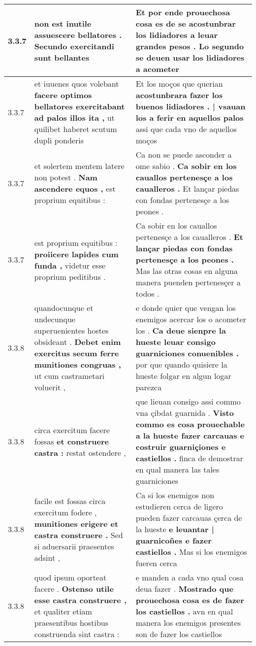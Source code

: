 \begin{tabular}{|p{1cm}|p{6.5cm}|p{6.5cm}|}
3.3.7 & non est inutile \textbf{ assuescere bellatores . } Secundo exercitandi sunt bellantes & Et por ende prouechosa cosa es de se acostunbrar los lidiadores a leuar grandes pesos . \textbf{ Lo segundo se deuen usar los lidiadores } a acometer \\\hline
3.3.7 & et iuuenes quos volebant \textbf{ facere optimos bellatores exercitabant ad palos illos ita , } ut quilibet haberet scutum dupli ponderis & Et los moços que querian \textbf{ acostunbrara fazer los buenos lidiadores . | vsauan los a ferir en aquellos palos } assi que cada vno de aquellos moços \\\hline
3.3.7 & et solertem mentem latere non potest . \textbf{ Nam ascendere equos , } est proprium equitibus : & Ca non se puede asconder a ome sabio . \textbf{ Ca sobir en los cauallos pertenesçe a los caualleros . } Et lançar piedas con fondas pertenesçe a los peones . \\\hline
3.3.7 & est proprium equitibus : \textbf{ proiicere lapides cum funda , } videtur esse proprium peditibus . & Ca sobir en los cauallos pertenesçe a los caualleros . \textbf{ Et lançar piedas con fondas pertenesçe a los peones . } Mas las otras cosas en alguna manera puenden pertenesçer a todos . \\\hline
3.3.8 & quandocunque et undecunque superuenientes hostes obsideant . \textbf{ Debet enim exercitus secum ferre munitiones congruas , } ut cum castrametari voluerit , & e donde quier que vengan los enemigos acercar los o acometer los . \textbf{ Ca deue sienpre la hueste leuar consigo guarniciones conuenibles . } por que quando quisiere la hueste folgar en algun logar parezca \\\hline
3.3.8 & circa exercitum facere fossas \textbf{ et construere castra : } restat ostendere , & que lieuan consigo assi commo vna çibdat guarnida . \textbf{ Visto commo es cosa prouechable a la hueste fazer carcauas e costruir guarniçiones e castiellos . } finca de demostrar en qual manera las tales guarniciones \\\hline
3.3.8 & facile est fossas circa exercitum fodere , \textbf{ munitiones erigere et castra construere . } Sed si aduersarii praesentes adsint , & Ca si los enemigos non estudieren cerca de ligero pueden fazer carcauas çerca de la hueste \textbf{ e leuantar | guarnicoñes e fazer castiellos . } Mas si los enemigos fueren cerca \\\hline
3.3.8 & quod ipsum oporteat facere . \textbf{ Ostenso utile esse castra construere , } et qualiter etiam praesentibus hostibus construenda sint castra : & e manden a cada vno qual cosa deua fazer . \textbf{ Mostrado que prouechosa cosa es de fazer los castiellos . } avn en qual manera los enemigos presentes son de fazer los castiellos \\\hline

\end{tabular}
